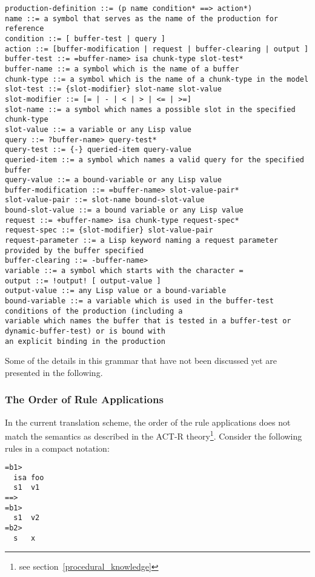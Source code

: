 \begin{lstlisting}[caption={The ACT-R production rule grammar}, label=lst:production_rule_grammar]
production-definition ::= (p name condition* ==> action*)
name ::= a symbol that serves as the name of the production for reference
condition ::= [ buffer-test | query ]
action ::= [buffer-modification | request | buffer-clearing | output ]
buffer-test ::= =buffer-name> isa chunk-type slot-test*
buffer-name ::= a symbol which is the name of a buffer
chunk-type ::= a symbol which is the name of a chunk-type in the model
slot-test ::= {slot-modifier} slot-name slot-value
slot-modifier ::= [= | - | < | > | <= | >=]
slot-name ::= a symbol which names a possible slot in the specified chunk-type
slot-value ::= a variable or any Lisp value
query ::= ?buffer-name> query-test*
query-test ::= {-} queried-item query-value
queried-item ::= a symbol which names a valid query for the specified buffer
query-value ::= a bound-variable or any Lisp value
buffer-modification ::= =buffer-name> slot-value-pair*
slot-value-pair ::= slot-name bound-slot-value
bound-slot-value ::= a bound variable or any Lisp value
request ::= +buffer-name> isa chunk-type request-spec*
request-spec ::= {slot-modifier} slot-value-pair
request-parameter ::= a Lisp keyword naming a request parameter provided by the buffer specified
buffer-clearing ::= -buffer-name>
variable ::= a symbol which starts with the character =
output ::= !output! [ output-value ]
output-value ::= any Lisp value or a bound-variable
bound-variable ::= a variable which is used in the buffer-test conditions of the production (including a
variable which names the buffer that is tested in a buffer-test or dynamic-buffer-test) or is bound with
an explicit binding in the production
\end{lstlisting}

Some of the details in this grammar that have not been discussed yet are presented in the following.

\subsubsection{The Order of Rule Applications}
\label{implementation:rule_application_order}

In the current translation scheme, the order of the rule applications does not match the semantics as described in the ACT-R theory\footnote{see section~\ref{procedural_knowledge}}. Consider the following rules in a compact notation:

\begin{lstlisting}
=b1>
  isa foo
  s1  v1
==>
=b1>
  s1  v2
=b2>
  s   x
\end{lstlisting}

